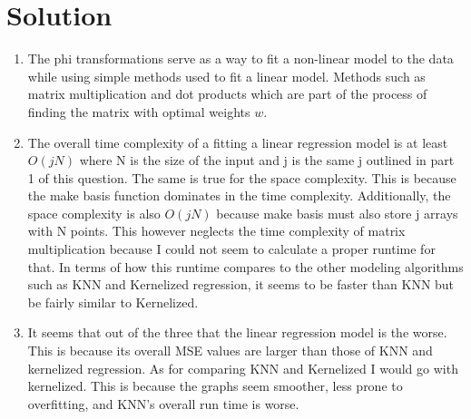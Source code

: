 \documentclass[submit]{harvardml}
\newenvironment{solution}
  {\color{blue}\section*{Solution}}
{}
\begin{document}
\begin{solution}
\begin{enumerate}
        \item The phi transformations serve as a way to fit a non-linear model to the data while using simple methods used to fit a linear model. Methods such as matrix multiplication and dot products which are part of the process of finding the matrix with optimal weights $w$.
        \item The overall time complexity of a fitting a linear regression model is at least $O(jN)$ where N is the size of the input and j is the same j outlined in part 1 of this question. The same is true for the space complexity. This is because the make basis function dominates in the time complexity. Additionally, the space complexity is also $O(jN)$ because make basis must also store j arrays with N points. This however neglects the time complexity of matrix multiplication because I could not seem to calculate a proper runtime for that. In terms of how this runtime compares to the other modeling algorithms such as KNN and Kernelized regression, it seems to be faster than KNN but be fairly similar to Kernelized.
        
        \item It seems that out of the three that the linear regression model is the worse. This is because its overall MSE values are larger than those of KNN and kernelized regression. As for comparing KNN and Kernelized I would go with kernelized. This is because the graphs seem smoother, less prone to overfitting, and KNN's overall run time is worse.
	\end{enumerate}
\end{solution}
\end{document}
